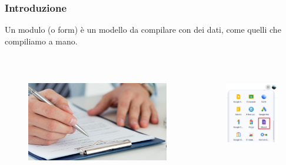 \documentclass[]{beamer}
\begin{document}
\begin{frame}
\frametitle{Introduzione}
Un modulo (o form) è un \alert{modello da compilare con dei dati}, come quelli che compiliamo a mano.

~

\begin{columns}
  \begin{column}{.5\textwidth}
    \begin{figure}
      \includegraphics[width=\columnwidth]{img/compilazionemodulo.jpg}
    \end{figure}
  \end{column}
  \begin{column}{.3\textwidth}
    \begin{figure}
      \includegraphics[width=\columnwidth]{img/moduli.png}
    \end{figure}
  \end{column}
\end{columns}\pause


\end{frame}
\end{document}
